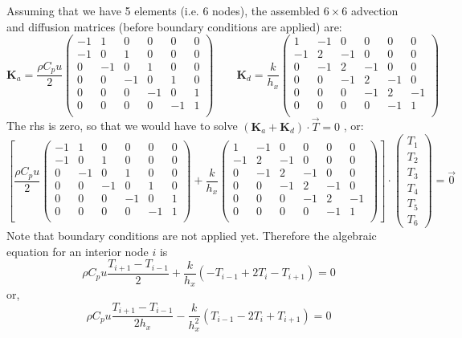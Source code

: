 Assuming that we have 5 elements (i.e. 6 nodes), the assembled $6\times 6$ 
advection and diffusion matrices 
(before boundary conditions are applied) are:
\[
{\bm K}_a
= \frac{\rho C_p u}{2}
\left(
\begin{array}{cccccc}
-1 & 1 & 0 & 0 & 0  &0\\
-1 & 0 & 1 & 0 & 0  &0\\
 0 &-1 & 0 & 1 & 0  &0\\
 0 & 0 &-1 & 0 & 1  &0\\
 0 & 0 & 0 &-1 & 0  &1\\
 0 & 0 & 0 & 0 &-1  &1\\
\end{array}
\right)
\qquad
{\bm K}_d
= \frac{k}{h_x}
\left(
\begin{array}{cccccc}
 1 &-1 & 0 & 0 & 0 &  0\\
-1 & 2 &-1 & 0 & 0 &  0\\
 0 &-1 & 2 &-1 & 0 &  0\\
 0 & 0 &-1 & 2 &-1 &  0\\
 0 & 0 & 0 &-1 & 2 & -1\\
 0 & 0 & 0 & 0 &-1 &  1\\
\end{array}
\right)
\]
The rhs is zero, so that we would have to solve $({\bm K}_a+{\bm K}_d)\cdot \vec{T}=0$ 
, or:
\[
\left[ 
\frac{\rho C_p u}{2}
\left(
\begin{array}{cccccc}
-1 & 1 & 0 & 0 & 0  &0\\
-1 & 0 & 1 & 0 & 0  &0\\
 0 &-1 & 0 & 1 & 0  &0\\
 0 & 0 &-1 & 0 & 1  &0\\
 0 & 0 & 0 &-1 & 0  &1\\
 0 & 0 & 0 & 0 &-1  &1\\
\end{array}
\right)
+
\frac{k}{h_x}
\left(
\begin{array}{cccccc}
 1 &-1 & 0 & 0 & 0 &  0\\
-1 & 2 &-1 & 0 & 0 &  0\\
 0 &-1 & 2 &-1 & 0 &  0\\
 0 & 0 &-1 & 2 &-1 &  0\\
 0 & 0 & 0 &-1 & 2 & -1\\
 0 & 0 & 0 & 0 &-1 &  1\\
\end{array}
\right)
\right]
\cdot
\left(
\begin{array}{c}
T_1 \\ T_2 \\ T_3 \\ T_4 \\ T_5 \\ T_6
\end{array}
\right)
= \vec{0}
\]
Note that boundary conditions are not applied yet. 
Therefore the algebraic equation for an interior node $i$ is 
\[
\rho C_p u
\frac{T_{i+1}-T_{i-1}}{2}
+
\frac{k}{h_x}
(-T_{i-1}+2T_i-T_{i+1}) = 0
\]
or, 
\begin{equation}
\boxed{
\rho C_p u
\frac{T_{i+1}-T_{i-1}}{2h_x}
-
\frac{k}{h_x^2}
(T_{i-1}-2T_i+T_{i+1}) = 0
} \label{eq:fdm1Ddiscr}
\end{equation}


